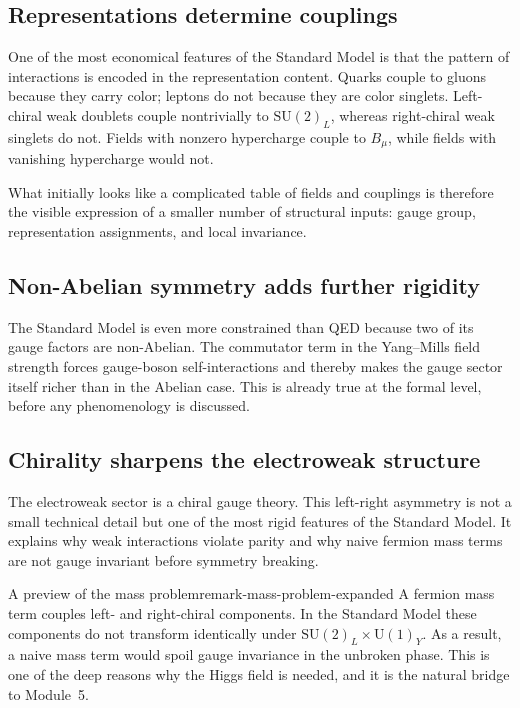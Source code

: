 \documentclass[11pt,a4paper]{article}
\newcommand{\SUw}{\mathrm{SU}(2)_L}
\newcommand{\UY}{\mathrm{U}(1)_Y}
\begin{document}
\subsection{Representations determine couplings}

One of the most economical features of the Standard Model is that the pattern of interactions is encoded in the representation content. Quarks couple to gluons because they carry color; leptons do not because they are color singlets. Left-chiral weak doublets couple nontrivially to \(\SUw\), whereas right-chiral weak singlets do not. Fields with nonzero hypercharge couple to \(B_\mu\), while fields with vanishing hypercharge would not.

What initially looks like a complicated table of fields and couplings is therefore the visible expression of a smaller number of structural inputs: gauge group, representation assignments, and local invariance.



\subsection{Non-Abelian symmetry adds further rigidity}

The Standard Model is even more constrained than QED because two of its gauge factors are non-Abelian. The commutator term in the Yang--Mills field strength forces gauge-boson self-interactions and thereby makes the gauge sector itself richer than in the Abelian case. This is already true at the formal level, before any phenomenology is discussed.



\subsection{Chirality sharpens the electroweak structure}

The electroweak sector is a chiral gauge theory. This left-right asymmetry is not a small technical detail but one of the most rigid features of the Standard Model. It explains why weak interactions violate parity and why naive fermion mass terms are not gauge invariant before symmetry breaking.


\begin{remarkbox}{A preview of the mass problem}{remark-mass-problem-expanded}
A fermion mass term couples left- and right-chiral components. In the Standard Model these components do not transform identically under \(\SUw\times\UY\). As a result, a naive mass term would spoil gauge invariance in the unbroken phase. This is one of the deep reasons why the Higgs field is needed, and it is the natural bridge to Module~5.
\end{remarkbox}
\end{document}
